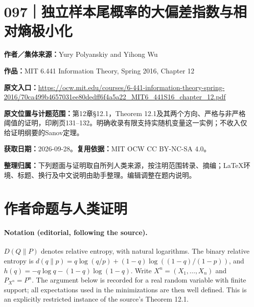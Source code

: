 \documentclass[UTF8,11pt,a4paper]{ctexart}
\theoremstyle{definition}\newtheorem*{definition}{Definition}
\theoremstyle{remark}\newtheorem*{remark}{Remark}
\begin{document}
\section*{097｜独立样本尾概率的大偏差指数与相对熵极小化}
\textbf{作者／集体来源：}Yury Polyanskiy and Yihong Wu

\textbf{作品：}MIT 6.441 Information Theory, Spring 2016, Chapter 12

\textbf{原文入口：}\url{https://ocw.mit.edu/courses/6-441-information-theory-spring-2016/70ca499b4657031ee80dedff6f4a5a22_MIT6_441S16_chapter_12.pdf}

\textbf{原文位置与计题范围：}第12章§12.1，Theorem 12.1及其两个方向、严格与非严格阈值的证明，印刷页131--132。明确收录有限支持实随机变量这一实例；不收入仅给证明纲要的Sanov定理。

\textbf{获取日期：}2026-09-28。\quad\textbf{复用依据：}MIT OCW CC BY-NC-SA 4.0。

\textbf{整理归属：}下列题面与证明取自所列人类来源，按注明范围转录、摘编；LaTeX环境、标题、换行及中文说明由助手整理。编辑调整在题内说明。

\section*{作者命题与人类证明}

\paragraph{Notation (editorial, following the source).}
$D(Q\|P)$ denotes relative entropy, with natural logarithms. The binary relative entropy is $d(q\|p)=q\log(q/p)+(1-q)\log((1-q)/(1-p))$, and $h(q)=-q\log q-(1-q)\log(1-q)$. Write $X^n=(X_1,\ldots,X_n)$ and $P_{X^n}=P^n$. The argument below is recorded for a real random variable with finite support; all expectations used in the minimizations are then well defined. This is an explicitly restricted instance of the source's Theorem 12.1.
\end{document}
